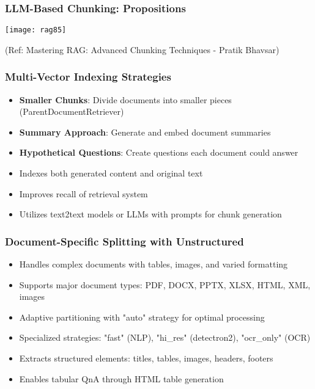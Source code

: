 \begin{frame}[fragile]\frametitle{LLM-Based Chunking: Propositions}

  
  	\begin{center}

	\texttt{[image: rag85]}
	
	{\tiny (Ref: Mastering RAG: Advanced Chunking Techniques - Pratik Bhavsar)}
	
	\end{center}
\end{frame}


\begin{frame}[fragile]\frametitle{Multi-Vector Indexing Strategies}
      \begin{itemize}
\item \textbf{Smaller Chunks}: Divide documents into smaller pieces (ParentDocumentRetriever)
\item \textbf{Summary Approach}: Generate and embed document summaries
\item \textbf{Hypothetical Questions}: Create questions each document could answer
\item Indexes both generated content and original text
\item Improves recall of retrieval system
\item Utilizes text2text models or LLMs with prompts for chunk generation
  \end{itemize}
\end{frame}

\begin{frame}[fragile]\frametitle{Document-Specific Splitting with Unstructured}
      \begin{itemize}
\item Handles complex documents with tables, images, and varied formatting
\item Supports major document types: PDF, DOCX, PPTX, XLSX, HTML, XML, images
\item Adaptive partitioning with "auto" strategy for optimal processing
\item Specialized strategies: "fast" (NLP), "hi\_res" (detectron2), "ocr\_only" (OCR)
\item Extracts structured elements: titles, tables, images, headers, footers
\item Enables tabular QnA through HTML table generation
  \end{itemize}
\end{frame}

